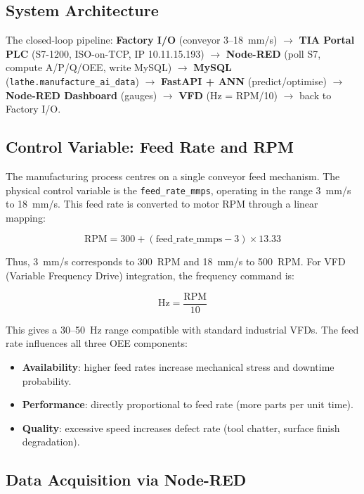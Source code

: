 \documentclass[a4paper,11pt]{article}
\begin{document}
\subsection{System Architecture}

The closed-loop pipeline: \textbf{Factory I/O} (conveyor 3--18~mm/s) $\rightarrow$ \textbf{TIA Portal PLC} (S7-1200, ISO-on-TCP, IP 10.11.15.193) $\rightarrow$ \textbf{Node-RED} (poll S7, compute A/P/Q/OEE, write MySQL) $\rightarrow$ \textbf{MySQL} (\texttt{lathe.manufacture\_ai\_data}) $\rightarrow$ \textbf{FastAPI + ANN} (predict/optimise) $\rightarrow$ \textbf{Node-RED Dashboard} (gauges) $\rightarrow$ \textbf{VFD} (Hz = RPM/10) $\rightarrow$ back to Factory I/O.

\subsection{Control Variable: Feed Rate and RPM}

The manufacturing process centres on a single conveyor feed mechanism. The physical control variable is the \texttt{feed\_rate\_mmps}, operating in the range 3~mm/s to 18~mm/s. This feed rate is converted to motor RPM through a linear mapping:

\begin{equation}
\text{RPM} = 300 + (\text{feed\_rate\_mmps} - 3) \times 13.33
\end{equation}

Thus, 3~mm/s corresponds to 300~RPM and 18~mm/s to 500~RPM. For VFD (Variable Frequency Drive) integration, the frequency command is:

\begin{equation}
\text{Hz} = \frac{\text{RPM}}{10}
\end{equation}

This gives a 30--50~Hz range compatible with standard industrial VFDs. The feed rate influences all three OEE components:
\begin{itemize}
    \item \textbf{Availability}: higher feed rates increase mechanical stress and downtime probability.
    \item \textbf{Performance}: directly proportional to feed rate (more parts per unit time).
    \item \textbf{Quality}: excessive speed increases defect rate (tool chatter, surface finish degradation).
\end{itemize}

\subsection{Data Acquisition via Node-RED}
\end{document}
